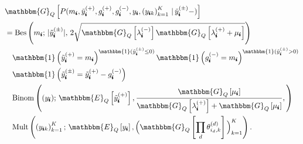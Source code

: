 \documentclass{article}
\newcommand{\subs}{\pmb{i}}
\newcommand{\wsup}[2]{#1_{\subs}^{(#2)}}
\newcommand{\ytP}{\wsup{\tilde{y}}{+}}
\newcommand{\ytPM}{\wsup{\tilde{y}}{\pm}}
\newcommand{\ysk}{y_{\subs k}}
\newcommand{\ys}{y_{\subs}}
\newcommand{\lamP}{\wsup{\lambda}{+}}
\newcommand{\lamM}{\wsup{\lambda}{-}}
\newcommand{\gP}{\wsup{g}{+}}
\newcommand{\gM}{\wsup{g}{-}}
\newcommand{\ms}{m_{\subs}}
\newcommand{\Eq}[1]{\mathbbm{E}_Q\left[#1\right]}
\newcommand{\Gq}[1]{\mathbbm{G}_Q\left[#1\right]}
\begin{document}
    \begin{align}
  &\Gq{P(\ms, \ytP, \gP, \gM, \ys, \left(\ysk\right)_{k=1}^K \,|\,\ytPM-)}\notag\\
  &= \text{Bes}\left(\ms;\, | \ytPM|,\,2\sqrt{\Gq{\lamM}\Gq{\lamP +\mu_{\subs}}}\right)\notag\\
  &\quad \mathbbm{1} \left(\ytP=\ms\right)^{\mathbbm{1}(\ytPM \leq 0)} 
   \mathbbm{1} \left(\gM=\ms\right)^{\mathbbm{1}(\ytPM > 0)} \notag \\
  &\quad \mathbbm{1}\left(\ytPM = \ytP - \gM\right)\notag\\
  &\quad \text{Binom}\left((\ys);\,
      \Eq{\ytP}, \frac{\Gq{\mu_{\subs}}}{\Gq{\lamP} + \Gq{\mu_{\subs}}},
      \right)\notag\\
  &\quad \text{Mult}\left(\left(\ysk\right)_{k=1}^K;\, \Eq{\ys}, \Big(\Gq{ \prod_d \theta_{i_d,k}^{(d)} }\Big)_{k=1}^K\right).
  \end{align}
  
\end{document}
